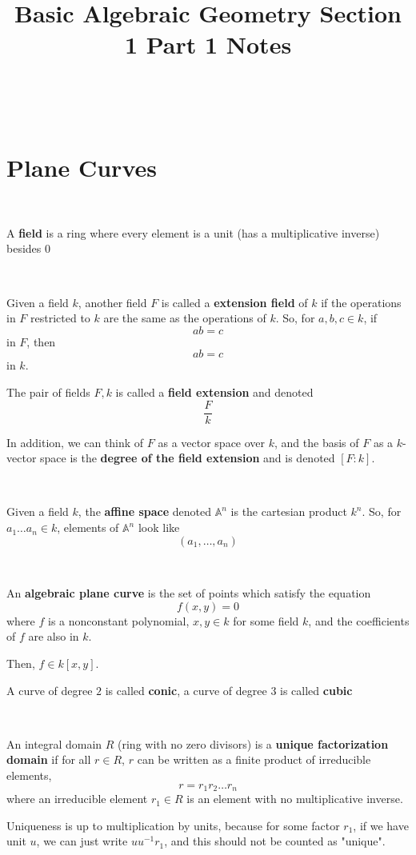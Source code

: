 \documentclass{article}
\title{Basic Algebraic Geometry Section 1 Part 1 Notes}
\begin{document}
\maketitle
\

\section{Plane Curves}

\begin{definition}[Fields]
	\

	A \textbf{field} is a ring where every element is a unit (has a multiplicative inverse) besides $0$
\end{definition}

\begin{definition}
	\

	Given a field $k$, another field $F$ is called a \textbf{extension field} of $k$ if the operations in $F$ restricted to $k$ are the same as the operations of $k$. So, for $a,b,c \in k$, if $$ab = c$$in $F$, then $$ab = c$$in $k$.

	The pair of fields $F, k$ is called a \textbf{field extension} and denoted $$\frac{F}{k}$$

	In addition, we can think of $F$ as a vector space over $k$, and the basis of $F$ as a $k$-vector space is the \textbf{degree of the field extension} and is denoted $[F:k]$.
\end{definition}

\begin{definition}
	\

	Given a field $k$, the \textbf{affine space} denoted $\mathbb{A}^n$ is the cartesian product $k^n$. So, for $a_1 \dots a_n \in k$, elements of $\mathbb{A}^n$ look like $$(a_1, \dots, a_n)$$
\end{definition}

\begin{definition}
	\

	An \textbf{algebraic plane curve} is the set of points which satisfy the equation $$f(x,y) = 0$$where $f$ is a nonconstant polynomial, $x, y \in k$ for some field $k$, and the coefficients of $f$ are also in $k$.

	Then, $f \in k[x,y]$.

	A curve of degree $2$ is called \textbf{conic}, a curve of degree $3$ is called \textbf{cubic}
\end{definition}


\begin{definition}
	\

	An integral domain $R$ (ring with no zero divisors) is a \textbf{unique factorization domain} if for all $r \in R$, $r$ can be written as a finite product of irreducible elements, $$r = r_1 r_2  \dots r_n$$where an irreducible element $r_1 \in R$ is an element with no multiplicative inverse.

	Uniqueness is up to multiplication by units, because for some factor $r_1$, if we have unit $u$, we can just write $u u ^{-1} r_1$, and this should not be counted as "unique".
\end{definition}
\end{document}
